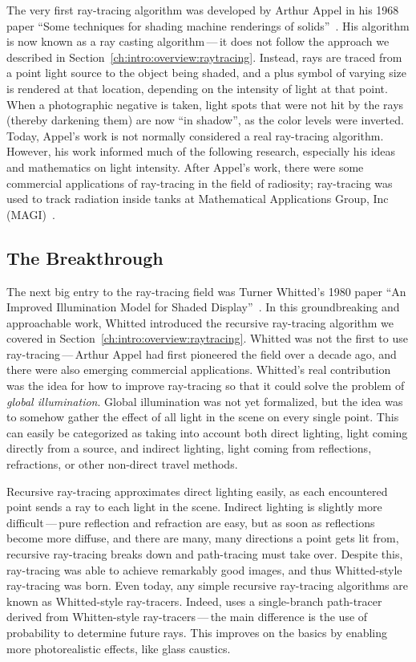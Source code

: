The very first ray-tracing algorithm was developed by Arthur Appel in his 1968 paper ``Some techniques for shading machine renderings of solids''~\cite{appel1968some}.
His algorithm is now known as a ray casting algorithm\,---\,it does not follow the approach we described in Section~\ref{ch:intro:overview:raytracing}.
Instead, rays are traced from a point light source to the object being shaded, and a plus symbol of varying size is rendered at that location, depending on the intensity of light at that point.
When a photographic negative is taken, light spots that were not hit by the rays (thereby darkening them) are now ``in shadow'', as the color levels were inverted.
Today, Appel's work is not normally considered a real ray-tracing algorithm.
However, his work informed much of the following research, especially his ideas and mathematics on light intensity.
After Appel's work, there were some commercial applications of ray-tracing in the field of radiosity; ray-tracing was used to track radiation inside tanks at Mathematical Applications Group, Inc (MAGI)~\cite{whitted2018explains}.

\subsection{The Breakthrough}
\label{ch:relatedwork:discovery:breakthrough}

The next big entry to the ray-tracing field was Turner Whitted's 1980 paper ``An Improved Illumination Model for Shaded Display''~\cite{whitted1980improved}.
In this groundbreaking and approachable work, Whitted introduced the recursive ray-tracing algorithm we covered in Section~\ref{ch:intro:overview:raytracing}.
Whitted was not the first to use ray-tracing\,---\,Arthur Appel had first pioneered the field over a decade ago, and there were also emerging commercial applications.
Whitted's real contribution was the idea for how to improve ray-tracing so that it could solve the problem of {\it global illumination}.
Global illumination was not yet formalized, but the idea was to somehow gather the effect of all light in the scene on every single point.
This can easily be categorized as taking into account both direct lighting, light coming directly from a source, and indirect lighting, light coming from reflections, refractions, or other non-direct travel methods.

Recursive ray-tracing approximates direct lighting easily, as each encountered point sends a ray to each light in the scene.
Indirect lighting is slightly more difficult\,---\,pure reflection and refraction are easy, but as soon as reflections become more diffuse, and there are many, many directions a point gets lit from, recursive ray-tracing breaks down and path-tracing must take over.
Despite this, ray-tracing was able to achieve remarkably good images, and thus Whitted-style ray-tracing was born.
Even today, any simple recursive ray-tracing algorithms are known as Whitted-style ray-tracers.
Indeed, \name{} uses a single-branch path-tracer derived from Whitten-style ray-tracers\,---\,the main difference is the use of probability to determine future rays.
This improves on the basics by enabling more photorealistic effects, like glass caustics.

